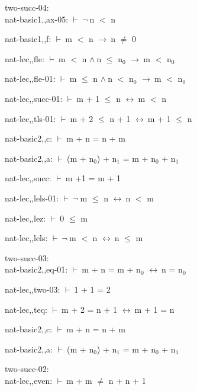 \documentclass[a4paper]{article}
\newcommand{\Fol}{\mbox{$\vdash\ $}}
\newcommand{\Not}{\mbox{$\neg\ $}}
\newcommand{\And}{\mbox{$\wedge\ $}}
\newcommand{\Imp}{\mbox{$\rightarrow\ $}}
\newcommand{\Equiv}{\mbox{$\leftrightarrow\ $}}
\begin{document}
two-succ-04:\\ nat-basic1,,ax-05: 
 \Fol \Not n $<$ n



nat-basic1,,f: 
 \Fol m $<$ n \Imp n $\neq$ 0



nat-lec,,fle: 
 \Fol m $<$ n \And n $\le$ $\mbox{n}_{0}$ \Imp m $<$ $\mbox{n}_{0}$



nat-lec,,fle-01: 
 \Fol m $\le$ n \And n $<$ $\mbox{n}_{0}$ \Imp m $<$ $\mbox{n}_{0}$



nat-lec,,succ-01: 
 \Fol m + 1 $\le$ n \Equiv m $<$ n



nat-lec,,tls-01: 
 \Fol m + 2 $\le$ n + 1 \Equiv m + 1 $\le$ n



nat-basic2,,c: 
 \Fol m + n = n + m



nat-basic2,,a: 
 \Fol (m + $\mbox{n}_{0}$) + $\mbox{n}_{1}$ = m + $\mbox{n}_{0}$ + $\mbox{n}_{1}$



nat-lec,,succ: 
 \Fol m +1 = m + 1



nat-lec,,lels-01: 
 \Fol \Not m $\le$ n \Equiv n $<$ m



nat-lec,,lez: 
 \Fol 0 $\le$ m



nat-lec,,lels: 
 \Fol \Not m $<$ n \Equiv n $\le$ m



\bigskip

two-succ-03:\\ nat-basic2,,eq-01: 
 \Fol m + n = m + $\mbox{n}_{0}$ \Equiv n = $\mbox{n}_{0}$



nat-lec,,two-03: 
 \Fol 1 + 1 = 2



nat-lec,,teq: 
 \Fol m + 2 = n + 1 \Equiv m + 1 = n



nat-basic2,,c: 
 \Fol m + n = n + m



nat-basic2,,a: 
 \Fol (m + $\mbox{n}_{0}$) + $\mbox{n}_{1}$ = m + $\mbox{n}_{0}$ + $\mbox{n}_{1}$



\bigskip

two-succ-02:\\ nat-lec,,even: 
 \Fol m + m $\neq$ n + n + 1
\end{document}
